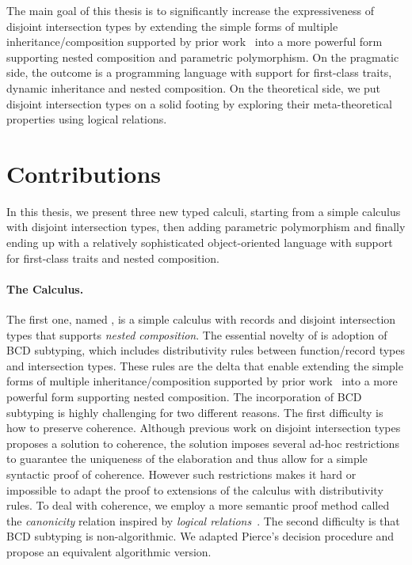 The main goal of this thesis is to significantly increase the expressiveness of
disjoint intersection types by extending the simple forms of multiple
inheritance/composition supported by prior work~\citep{alpuimdisjoint, oliveira2016disjoint}
into a more powerful form supporting nested composition
and parametric polymorphism. On the pragmatic side, the outcome is a programming
language with support for first-class traits, dynamic inheritance and nested
composition. On the theoretical side, we put disjoint intersection types on a
solid footing by exploring their meta-theoretical properties using logical
relations.


\section{Contributions}

In this thesis, we present three new typed calculi, starting from a simple
calculus with disjoint intersection types, then adding parametric polymorphism
and finally ending up with a relatively sophisticated object-oriented language
with support for first-class traits and nested composition.

\paragraph{The \namee Calculus.}

The first one, named \namee, is a simple calculus with records and disjoint
intersection types that supports \emph{nested composition}. The essential
novelty of \namee is adoption of BCD subtyping, which includes distributivity
rules between function/record types and intersection types. These rules are the
delta that enable extending the simple forms of multiple inheritance/composition
supported by prior work~\citep{oliveira2016disjoint} into a more powerful form
supporting nested composition. The incorporation of BCD subtyping is highly
challenging for two different reasons. The first difficulty is how to preserve
coherence. Although previous work on disjoint intersection types proposes a
solution to coherence, the solution imposes several ad-hoc restrictions to
guarantee the uniqueness of the elaboration and thus allow for a simple
syntactic proof of coherence. However such restrictions makes it hard or
impossible to adapt the proof to extensions of the calculus with distributivity
rules. To deal with coherence, we employ a more semantic proof method called the
\textit{canonicity} relation inspired by \emph{logical relations}~\citep{tait,
  plotkin1973lambda, statman1985logical}. The second difficulty is that BCD
subtyping is non-algorithmic. We adapted Pierce's decision procedure and propose
an equivalent algorithmic version.

